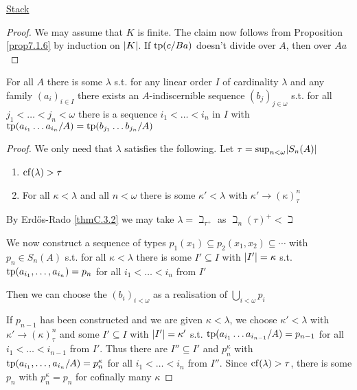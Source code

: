 \documentclass[11pt]{article}
\begin{document}
\href{https://math.stackexchange.com/questions/2982044/tent-ziegler-lemma-7-2-11}{Stack}

\begin{proof}
We may assume that \(K\) is finite. The claim now follows from Proposition \ref{prop7.1.6} by
induction on \(\abs{K}\). If \(\operatorname{tp}(c/Ba)\) doesn't divide over \(A\), then over \(Aa\)
\end{proof}

\begin{lemma}[Shelah]
\label{lemma7.2.12}
For all \(A\) there is some \(\lambda\) s.t. for any linear order \(I\) of cardinality \(\lambda\) and any
family \((a_i)_{i\in I}\) there exists an \(A\)-indiscernible sequence \((b_j)_{j\in\omega}\) s.t. for
all \(j_1<\dots<j_n<\omega\) there is a sequence \(i_1<\dots<i_n\) in \(I\)
with \(\operatorname{tp}(a_{i_1}\dots a_{i_n}/A)=\operatorname{tp}(b_{j_1}\dots b_{j_n}/A)\)
\end{lemma}

\begin{proof}
We only need that \(\lambda\) satisfies the following. Let \(\tau=\sup_{n<\omega}\abs{S_n(A)}\)
\begin{enumerate}
\item \(\operatorname{cf}(\lambda)>\tau\)
\item For all \(\kappa<\lambda\) and all \(n<\omega\) there is some \(\kappa'<\lambda\) with \(\kappa'\to(\kappa)^n_\tau\)
\end{enumerate}


By Erdős-Rado \ref{thmC.3.2} we may take \(\lambda=\beth_{\tau^+}\) as \(\beth_n(\tau)^+<\beth\)

We now construct a sequence of types \(p_1(x_1)\subseteq p_2(x_1,x_2)\subseteq\cdots\) with \(p_n\in S_n(A)\) s.t. for
all \(\kappa<\lambda\) there is some \(I'\subseteq I\) with \(\abs{I'}=\kappa\) s.t. \(\operatorname{tp}(a_{i_1},\dots,a_{i_n})=p_n\) for
all \(i_1<\dots<i_n\) from \(I'\)

Then we can choose the \((b_i)_{i<\omega}\) as a realisation of \(\bigcup_{i<\omega}p_i\)

If \(p_{n-1}\) has been constructed and we are given \(\kappa<\lambda\), we choose \(\kappa'<\lambda\)
with \(\kappa'\to(\kappa)_\tau^n\) and some \(I'\subseteq I\) with \(\abs{I'}=\kappa'\)
s.t. \(\operatorname{tp}(a_{i_1}\dots a_{i_{n-1}}/A)=p_{n-1}\) for all \(i_1<\dots<i_{n-1}\) from \(I'\). Thus there
are \(I''\subseteq I'\) and \(p_n^\kappa\) with \(\operatorname{tp}(a_{i_1},\dots,a_{i_n}/A)=p_n^\kappa\) for all \(i_1<\dots<i_n\)
from \(I''\). Since \(\operatorname{cf}(\lambda)>\tau\), there is some \(p_n\) with \(p_n^\kappa=p_n\) for cofinally many \(\kappa\)
\end{proof}
\end{document}
